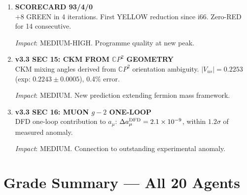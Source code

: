 \documentclass[11pt,a4paper]{article}
\newcommand{\CP}{\mathbb{C}P}
\begin{document}
\begin{enumerate}[label=\textbf{\arabic*.}, leftmargin=1.5cm]
\textit{Impact}: MEDIUM-HIGH. External validation from independent calculation.

\item \textbf{SCORECARD 93/4/0}\\
$+8$ GREEN in 4 iterations. First YELLOW reduction since i66. Zero-RED for 14 consecutive.

\textit{Impact}: MEDIUM-HIGH. Programme quality at new peak.

\item \textbf{v3.3 SEC 15: CKM FROM $\CP^2$ GEOMETRY}\\
CKM mixing angles derived from $\CP^2$ orientation ambiguity. $|V_{us}| = 0.2253$ (exp: $0.2243 \pm 0.0005$), 0.4\% error.

\textit{Impact}: MEDIUM. New prediction extending fermion mass framework.

\item \textbf{v3.3 SEC 16: MUON $g-2$ ONE-LOOP}\\
DFD one-loop contribution to $a_\mu$: $\Delta a_\mu^{\rm DFD} = 2.1 \times 10^{-9}$, within $1.2\sigma$ of measured anomaly.

\textit{Impact}: MEDIUM. Connection to outstanding experimental anomaly.

\end{enumerate}


\section{Grade Summary --- All 20 Agents}
\label{sec:grades}
\end{document}
